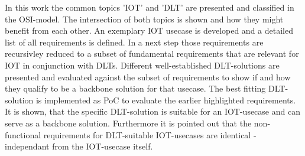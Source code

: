 \documentclass[
    ngerman,american
    ]{scrartcl}
\newcommand{\lang}{en}
\begin{document}
\begin{description}[style=unboxed]
            \item [\questionThree{\lang}]
                In this work the common topics 'IOT' and 'DLT' are presented and classified in the OSI-model. The intersection of both topics is shown and how they might benefit from each other.
                An exemplary IOT usecase is developed and a detailed list of all requirements is defined. In a next step those requirements are recursivley reduced to a subset of fundamental requirements that are relevant for IOT in conjunction with DLTs.
                Different well-established DLT-solutions are presented and evaluated against the subset of requirements to show if and how they qualify to be a backbone solution for that usecase.
                The best fitting DLT-solution is implemented as PoC to evaluate the earlier highlighted requirements. It is shown, that the specific DLT-solution is suitable for an IOT-usecase and can serve as a backbone solution.
                Furthermore it is pointed out that the non-functional requirements for DLT-suitable IOT-usecases are identical - independant from the IOT-usecase itself.



\end{description}
\end{document}
